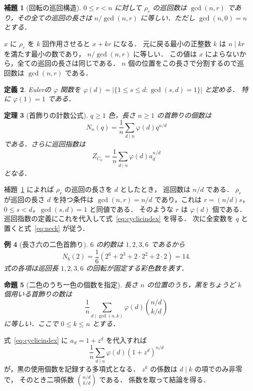 \documentclass[a5paper,10pt,onecolumn]{jsarticle}
\makeatletter
\theoremstyle{mathnotetheorem}
\newtheorem{theorem}{定理}[section]
\newtheorem{definition}[theorem]{定義}
\newtheorem{lemma}[theorem]{補題}
\newtheorem{proposition}[theorem]{命題}
\newtheorem{example}[theorem]{例}
\renewcommand{\proofname}{証明}
\renewenvironment{proof}[1][\proofname]{%
  \par\pushQED{\qed}\normalfont\topsep4\p@\@plus2\p@\relax
  \trivlist\item[\hskip\labelsep\bfseries #1]\ignorespaces
}{\popQED\endtrivlist\@endpefalse}
\makeatother
\begin{document}
\begin{lemma}[回転の巡回構造]\label{lem:rotcycles}
$0\le r<n$ に対して $\rho_r$ の巡回数は
$\gcd(n,r)$ であり，その全ての巡回の長さは
$n/\gcd(n,r)$ に等しい．ただし $\gcd(n,0)=n$ とする．
\end{lemma}
\begin{proof}
$x$ に $\rho_r$ を $k$ 回作用させると $x+kr$ になる．
元に戻る最小の正整数 $k$ は $n\mid kr$ を満たす最小の数であり，
$n/\gcd(n,r)$ に等しい．
この値は $x$ によらないから，全ての巡回の長さは同じである．
$n$ 個の位置をこの長さで分割するので巡回数は $\gcd(n,r)$ である．
\end{proof}

\begin{definition}
Eulerの $\varphi$ 関数を
$\varphi(d)=|\{1\le s\le d:\gcd(s,d)=1\}|$ と定める．
特に $\varphi(1)=1$ である．
\end{definition}

\begin{theorem}[首飾りの計数公式]\label{thm:necklaces}
$q\ge1$ 色，長さ $n\ge1$ の首飾りの個数は
\begin{equation}\label{eq:neck}
 N_n(q)=\frac1n\sum_{d\mid n}
 \varphi(d)q^{n/d}
\end{equation}
である．さらに巡回指数は
\begin{equation}\label{eq:cyclicindex}
 Z_{C_n}=\frac1n\sum_{d\mid n}
 \varphi(d)a_d^{n/d}
\end{equation}
となる．
\end{theorem}
\begin{proof}
補題~\ref{lem:rotcycles} によれば
$\rho_r$ の巡回の長さを $d$ としたとき，
巡回数は $n/d$ である．
$\rho_r$ が巡回の長さ $d$ を持つ条件は
$\gcd(n,r)=n/d$ であり，これは
$r=(n/d)s$，$0\le s<d$，$\gcd(s,d)=1$ と同値である．
そのような $r$ は $\varphi(d)$ 個である．
巡回指数の定義にこれを代入して式~\eqref{eq:cyclicindex} を得る．
次に全変数を $q$ と置くと式~\eqref{eq:neck} が従う．
\end{proof}

\begin{example}[長さ六の二色首飾り]
$6$ の約数は $1,2,3,6$ であるから
\[
 N_6(2)=\frac16(2^6+2^3+2\cdot2^2+2\cdot2)=14.
\]
式の各項は巡回長 $1,2,3,6$ の回転が固定する彩色数を表す．
\end{example}

\begin{proposition}[二色のうち一色の個数を指定]
長さ $n$ の位置のうち，黒をちょうど $k$ 個用いる首飾りの数は
\begin{equation}\label{eq:binaryneck}
 \frac1n\sum_{d\mid\gcd(n,k)}
 \varphi(d){n/d\choose k/d}
\end{equation}
に等しい．ここで $0\le k\le n$ とする．
\end{proposition}
\begin{proof}
式~\eqref{eq:cyclicindex} に
$a_d=1+z^d$ を代入すれば
\[
 \frac1n\sum_{d\mid n}\varphi(d)(1+z^d)^{n/d}
\]
が，黒の使用個数を記録する多項式となる．
$z^k$ の係数は $d\mid k$ の項でのみ非零で，
そのとき二項係数 ${n/d\choose k/d}$ である．
係数を取って結論を得る．
\end{proof}
\end{document}
